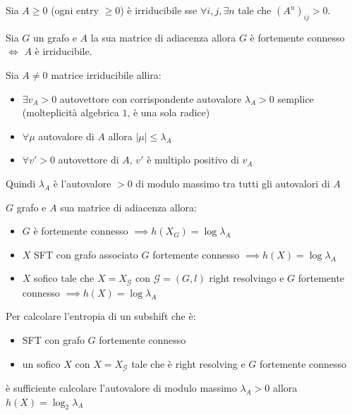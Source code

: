 \begin{definizione}
    Sia $A\ge 0$ (ogni entry $\ge 0$) è irriducibile sse $\forall i,j,\exists n$ 
    tale che $(A^n)_{ij}>0$.
\end{definizione}
\begin{teorema}
    Sia $G$ un grafo e $A$ la sua matrice di adiacenza allora $G$ è fortemente 
    connesso $\iff$ $A$ è irriducibile.
\end{teorema}
\begin{teorema}
    Sia $A\ne 0$ matrice irriducibile allira:
    \begin{itemize}
        \item $\exists v_A>0$ autovettore con corrispondente autovalore $\lambda_A>0$
        semplice (molteplicità algebrica $1$, è una sola radice)
        \item $\forall \mu $ autovalore di $A$ allora $|\mu| \le\lambda_A$
        \item $\forall v'>0$ autovettore di $A$, $v'$ è multiplo positivo di $v_A$
    \end{itemize}
    Quindi $\lambda_A$ è l'autovalore $>0$ di modulo massimo tra tutti gli autovalori 
    di $A$
\end{teorema}
\begin{teorema}
    $G$ grafo e $A$ sua matrice di adiacenza allora:
    \begin{itemize}
        \item $G$ è fortemente connesso $\implies h(X_G) = \log\lambda_A$
        \item $X$ SFT con grafo associato $G$ fortemente connesso $\implies h(X) = \log\lambda_A$
        \item $X$ sofico tale che $X=X_\mathcal{G}$ con $\mathcal{G} = (G,l)$ right 
        resolvingo e $G$ fortemente connesso $\implies h(X)=\log \lambda_A$
    \end{itemize}
\end{teorema}
Per calcolare l'entropia di un subshift che è:
\begin{itemize}
    \item SFT con grafo $G$ fortemente connesso
    \item un sofico $X$ con $X=X_\mathcal{G}$ tale che è right resolving e $G$ fortemente
    connesso
\end{itemize}
è sufficiente calcolare l'autovalore di modulo massimo $\lambda_A>0$ allora $h(X)=\log_2\lambda_A$

